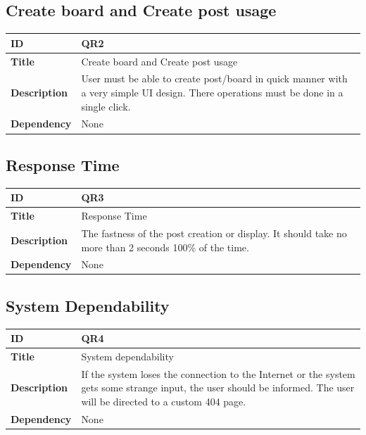 \documentclass[12pt]{report}
\begin{document}
\subsection{Create board and Create post usage}

\begin{tabularx}{\textwidth} { 
  | >{\raggedright\arraybackslash}X 
  | >{\raggedright\arraybackslash}X |}
 \hline
 \textbf{ID} & QR2 \\
 \hline
 \textbf{Title}  & Create board and Create post usage  \\
 \hline
 \textbf{Description} & User must be able to create post/board in quick manner with a very simple UI design. There operations must be done in a single click. \\
 \hline 
 \textbf{Dependency} & None \\
 \hline 
\end{tabularx}

\subsection{Response Time}

\begin{tabularx}{\textwidth} { 
  | >{\raggedright\arraybackslash}X 
  | >{\raggedright\arraybackslash}X |}
 \hline
 \textbf{ID} & QR3 \\
 \hline
 \textbf{Title}  & Response Time  \\
 \hline
 \textbf{Description} & The fastness of the post creation or display. It should take no more than 2 seconds 100\% of the time. \\
 \hline 
 \textbf{Dependency} & None \\
 \hline 
\end{tabularx}

\subsection{System Dependability}

\begin{tabularx}{\textwidth} { 
  | >{\raggedright\arraybackslash}X 
  | >{\raggedright\arraybackslash}X |}
 \hline
 \textbf{ID} & QR4 \\
 \hline
 \textbf{Title}  & System dependability  \\
 \hline
 \textbf{Description} & If the system loses the connection to the Internet or the system gets some strange input, the user should be informed. The user will be directed to a custom 404 page. \\
 \hline 
 \textbf{Dependency} & None \\
 \hline 
\end{tabularx}
\end{document}
